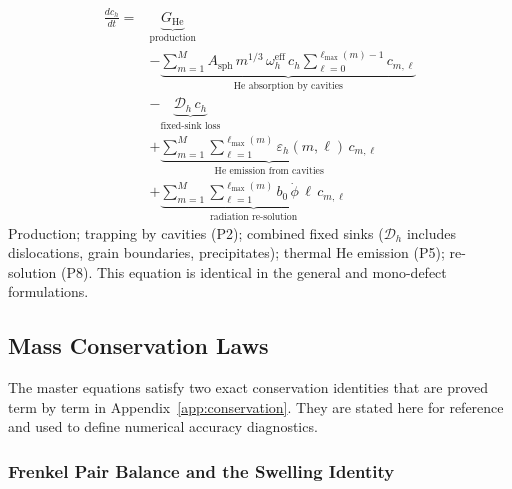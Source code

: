 \documentclass[pdflatex,sn-basic]{sn-jnl} %
\begin{document}
\clearpage
\begin{equation}\label{eq:ME_He}
\boxed{
\begin{split}
\frac{dc_h}{dt} = {} &
  \underbrace{G_{\mathrm{He}}}_{\text{production}}
  \\[6pt]
  &- \underbrace{
     \sum_{m=1}^{M}
     A_{\mathrm{sph}}\,m^{1/3}\,\omega_h^{\mathrm{eff}}\,c_h
     \sum_{\ell=0}^{\ell_{\max}(m)-1} c_{m,\ell}
     }_{\text{He absorption by cavities}}
  \\[6pt]
  &- \underbrace{
     \mathcal{D}_h\,c_h
     }_{\text{fixed-sink loss}}
  \\[6pt]
  &+ \underbrace{
     \sum_{m=1}^{M}\sum_{\ell=1}^{\ell_{\max}(m)}
     \varepsilon_h(m,\ell)\,c_{m,\ell}
     }_{\text{He emission from cavities}}
  \\[6pt]
  &+ \underbrace{
     \sum_{m=1}^{M}\sum_{\ell=1}^{\ell_{\max}(m)}
     b_0\,\dot{\phi}\,\ell\,c_{m,\ell}
     }_{\text{radiation re-solution}}
\end{split}
}
\end{equation}
Production; trapping by cavities (P2); combined fixed sinks
($\mathcal{D}_h$ includes dislocations, grain boundaries, precipitates);
thermal He emission (P5); re-solution (P8). This equation is identical
in the general and mono-defect formulations.


\subsection{Mass Conservation Laws}
\label{sec:mass_conservation}

The master equations satisfy two exact conservation identities that are
proved term by term in Appendix~\ref{app:conservation}. They are stated
here for reference and used to define numerical accuracy diagnostics.

\subsubsection{Frenkel Pair Balance and the Swelling Identity}
\label{sec:FP_balance}
\end{document}

